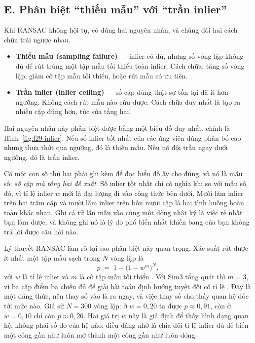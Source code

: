 \documentclass[../../deep_learning.tex]{subfiles}
\begin{document}
\subsection{E. Phân biệt ``thiếu mẫu'' với ``trần inlier''}
Khi RANSAC không hội tụ, có đúng hai nguyên nhân, và chúng đòi hai cách chữa trái ngược nhau.

\begin{itemize}
\item \textbf{Thiếu mẫu (sampling failure)} --- inlier có đủ, nhưng số vòng lặp không đủ để rút trúng một tập mẫu tối thiểu toàn inlier. Cách chữa: tăng số vòng lặp, giảm cỡ tập mẫu tối thiểu, hoặc rút mẫu có ưu tiên.
\item \textbf{Trần inlier (inlier ceiling)} --- số cặp đúng thật sự tồn tại đã ít hơn ngưỡng. Không cách rút mẫu nào cứu được. Cách chữa duy nhất là tạo ra nhiều cặp đúng hơn, tức sửa tầng hai.
\end{itemize}

Hai nguyên nhân này phân biệt được bằng một biểu đồ duy nhất, chính là Hình~\ref{fig:f29-inlier}. Nếu số inlier tốt nhất của các ứng viên đúng phân bố cao nhưng thưa thớt qua ngưỡng, đó là thiếu mẫu. Nếu nó đội trần ngay dưới ngưỡng, đó là trần inlier.

Có một con số thứ hai phải ghi kèm để đọc biểu đồ ấy cho đúng, và nó là mẫu số: \emph{số cặp mà tầng hai đề xuất}. Số inlier tốt nhất chỉ có nghĩa khi so với mẫu số đó, vì tỉ lệ inlier \(w\) mới là đại lượng đi vào công thức bên dưới. Mười lăm inlier trên hai trăm cặp và mười lăm inlier trên bốn mươi cặp là hai tình huống hoàn toàn khác nhau. Ghi cả tử lẫn mẫu vào cùng một dòng nhật ký là việc rẻ nhất bạn làm được, và không ghi nó là lý do phổ biến nhất khiến bảng của bạn không trả lời được câu hỏi nào.

Lý thuyết RANSAC làm rõ tại sao phân biệt này quan trọng. Xác suất rút được ít nhất một tập mẫu sạch trong \(N\) vòng lặp là
\[
p \;=\; 1-\bigl(1-w^{m}\bigr)^{N},
\]
với \(w\) là tỉ lệ inlier và \(m\) là cỡ tập mẫu tối thiểu \cite{f29fischler1981ransac}. Với Sim3 tổng quát thì \(m=3\), vì ba cặp điểm ba chiều đủ để giải bài toán định hướng tuyệt đối có tỉ lệ \cite{f29horn1987closed,f29umeyama1991least}. Đây là một đẳng thức, nên thay số vào là ra ngay, và việc thay số cho thấy quan hệ dốc tới mức nào. Giả sử \(N=300\) vòng lặp: ở \(w=0{,}20\) ta được \(p\approx0{,}91\), còn ở \(w=0{,}10\) chỉ còn \(p\approx0{,}26\). Hai giá trị \(w\) này là giả định để thấy hình dạng quan hệ, không phải số đo của hệ nào; điều đáng nhớ là chia đôi tỉ lệ inlier đủ để biến một cổng gần như luôn mở thành một cổng gần như luôn đóng.
\end{document}
